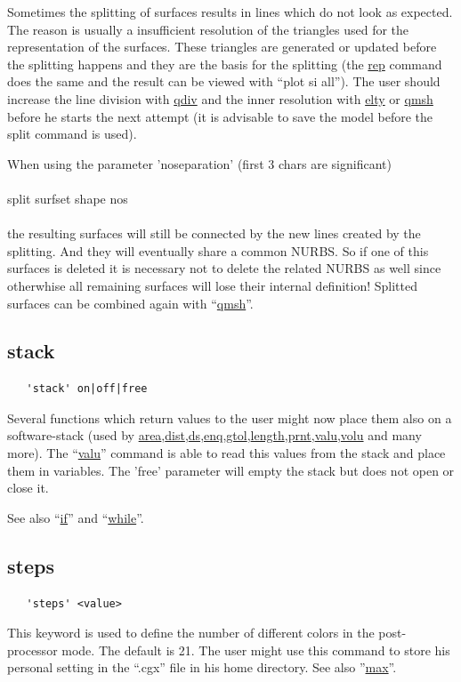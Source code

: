 \documentclass{article}
\providecommand{\htmlref}[2]{\hyperref[#2]{#1}}
\begin{document}
Sometimes the splitting of surfaces results in lines which do not look as expected. The reason is usually a insufficient resolution of the triangles used for the representation of the surfaces. These triangles are generated or updated before the splitting happens and they are the basis for the splitting (the \htmlref{rep}{rep} command does the same and the result can be viewed with ``plot si all''). The user should increase the line division with \htmlref{qdiv}{qdiv} and the inner resolution with \htmlref{elty}{elty} or \htmlref{qmsh}{qmsh} before he starts the next attempt (it is advisable to save the model before the split command is used).

When using the parameter 'noseparation' (first 3 chars are significant)\\\\split surfset shape nos\\\\ the resulting surfaces will still be connected by the new lines created by the splitting. And they will eventually share a common NURBS. So if one of this surfaces is deleted it is necessary not to delete the related NURBS as well since otherwhise all remaining surfaces will lose their internal definition! Splitted surfaces can be combined again with ``\htmlref{qmsh}{qmsh}''.


\subsection{\label{stack}stack}
\begin{verbatim}
   'stack' on|off|free
\end{verbatim}
Several functions which return values to the user might now place them also on a software-stack (used by \htmlref{area}{area},\htmlref{dist}{dist},\htmlref{ds}{ds},\htmlref{enq}{enq},\htmlref{gtol}{gtol},\htmlref{length}{length},\htmlref{prnt}{prnt},\htmlref{valu}{valu},\htmlref{volu}{volu} and many more). The ``\htmlref{valu}{valu}'' command is able to read this values from the stack and place them in variables. The 'free' parameter will empty the stack but does not open or close it.

See also ``\htmlref{if}{if}'' and ``\htmlref{while}{while}''.

\subsection{\label{steps}steps}
\begin{verbatim}
   'steps' <value> 
\end{verbatim}
This keyword is used to define the number of different colors in the post-processor mode. The default is 21. The user might use this command to store his personal setting in the ``.cgx'' file in his home directory. See also ''\htmlref{max}{max}''.
\end{document}
